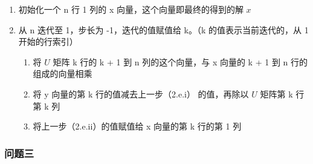 \begin{enumerate}
\begin{enumerate}
\begin{enumerate}
                    \end{enumerate}
              \item 初始化一个 n 行 1 列的 x 向量，这个向量即最终的得到的解 $x$
              \item 从 n 迭代至 1，步长为 -1，迭代的值赋值给 k。（k 的值表示当前迭代的，从 1 开始的行索引）
                    \begin{enumerate}
                        \item 将 $U$ 矩阵 k 行的 k + 1 到 n 列的这个向量，与 x 向量的 k + 1 到 n 行的组成的向量相乘
                        \item 将 y 向量的第 k 行的值减去上一步（2.e.i） 的值，再除以 $U$ 矩阵第 k 行第 k 列
                        \item 将上一步（2.e.ii）的值赋值给 x 向量的第 k 行的第 1 列
                    \end{enumerate}
          \end{enumerate}
\end{enumerate}

\subsubsection{问题三}
